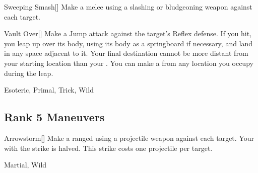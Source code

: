 \lowercase{\hypertarget{maneuver:Sweeping Smash}{}}\label{maneuver:Sweeping Smash}
\hypertarget{maneuver:Sweeping Smash}{}
\begin{freeability}[Rank 4]{Sweeping Smash}[]
Make a melee  using a slashing or bludgeoning weapon against each target.


\end{freeability}
\vspace{0.25em}



\lowercase{\hypertarget{maneuver:Vault Over}{}}\label{maneuver:Vault Over}
\hypertarget{maneuver:Vault Over}{}
\begin{freeability}[Rank 4]{Vault Over}[]
Make a Jump attack against the target's Reflex defense.
If you hit, you leap up over its body, using its body as a springboard if necessary, and land in any space adjacent to it.
Your final destination cannot be more distant from your starting location than your .
You can make a  from any location you occupy during the leap.


 Esoteric, Primal, Trick, Wild
\end{freeability}
\vspace{0.25em}


\subsection{Rank 5 Maneuvers}

\lowercase{\hypertarget{maneuver:Arrowstorm}{}}\label{maneuver:Arrowstorm}
\hypertarget{maneuver:Arrowstorm}{}
\begin{freeability}[Rank 5]{Arrowstorm}[]
Make a ranged  using a projectile weapon against each target.
Your  with the strike is halved.
This strike costs one projectile per target.


 Martial, Wild
\end{freeability}
\vspace{0.25em}



